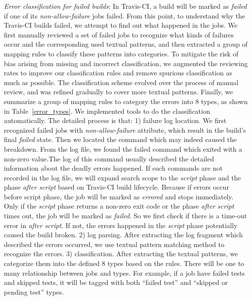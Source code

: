 
\emph{Error classification for failed builds}: 
In Travis-CI, a build will be marked as \textit{failed} if one of its \textit{non-allow-failure} jobs failed. From this point, to understand why the Travis-CI builds failed, we attempt to find out what happened in the jobs. We first manually reviewed a set of failed jobs to recognize what kinds of failures occur and the corresponding used textual patterns, and then extracted a group of mapping rules to classify these patterns into categories. To mitigate the risk of bias arising from missing and incorrect classification, we augmented the reviewing rates to improve our classification rules and remove spurious classification as much as possible. The classification scheme evolved over the process of manual review, and was refined gradually to cover more textual patterns. Finally, we summarize a group of mapping rules to category the errors into 8 types, as shown in Table~\ref{error_types}. 
We implemented tools to do the classification automatically. The detailed process is that: 1) failure log location. We first recognized failed jobs with \textit{non-allow-failure} attribute, which result in the build's final \textit{failed} state. Then we located the command which may indeed caused the breakdown. From the log file, we found the failed command which exited with a non-zero value.The log of this command usually described the detailed information about the deadly errors happened. If such commands are not recorded in the log file, we will expand search scope to the \textit{script} phase and the phase \textit{after script} based on Travis-CI build lifecycle. Because if errors occur before script phase, the job will be marked as \textit{errored} and stops immediately. Only if the \textit{script} phase returns a non-zero exit code or the phase \textit{after script} times out, the job will be marked as \textit{failed}. So we first check if there is a time-out error in \textit{after script}. If not, the errors happened in the \textit{script} phase potentially caused the build broken. 
2) log parsing. After extracting the log fragment which described the errors occurred, we use textual pattern matching method to recognize the errors. 
3) classification. After extracting the textual patterns, we categorize them  into the defined 8 types based on the rules. There will be one to many relationship between jobs and types. For example, if a job have failed tests and skipped tests, it will be tagged with both “failed test” and “skipped or pending test” types.


